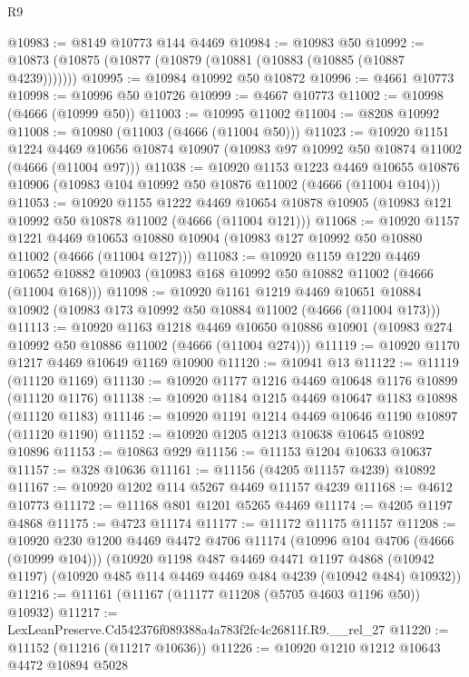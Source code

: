 \begin{lexlean}{R9}
\begin{coremodule}
@10983 := @8149 @10773 @144 @4469
@10984 := @10983 @50
@10992 := @10873 (@10875 (@10877 (@10879 (@10881 (@10883 (@10885 (@10887 @4239)))))))
@10995 := @10984 @10992 @50 @10872
@10996 := @4661 @10773
@10998 := @10996 @50 @10726
@10999 := @4667 @10773
@11002 := @10998 (@4666 (@10999 @50))
@11003 := @10995 @11002
@11004 := @8208 @10992
@11008 := @10980 (@11003 (@4666 (@11004 @50)))
@11023 := @10920
    @1151
    @1224
    @4469
    @10656
    @10874
    @10907
    (@10983 @97 @10992 @50 @10874 @11002 (@4666 (@11004 @97)))
@11038 := @10920
    @1153
    @1223
    @4469
    @10655
    @10876
    @10906
    (@10983 @104 @10992 @50 @10876 @11002 (@4666 (@11004 @104)))
@11053 := @10920
    @1155
    @1222
    @4469
    @10654
    @10878
    @10905
    (@10983 @121 @10992 @50 @10878 @11002 (@4666 (@11004 @121)))
@11068 := @10920
    @1157
    @1221
    @4469
    @10653
    @10880
    @10904
    (@10983 @127 @10992 @50 @10880 @11002 (@4666 (@11004 @127)))
@11083 := @10920
    @1159
    @1220
    @4469
    @10652
    @10882
    @10903
    (@10983 @168 @10992 @50 @10882 @11002 (@4666 (@11004 @168)))
@11098 := @10920
    @1161
    @1219
    @4469
    @10651
    @10884
    @10902
    (@10983 @173 @10992 @50 @10884 @11002 (@4666 (@11004 @173)))
@11113 := @10920
    @1163
    @1218
    @4469
    @10650
    @10886
    @10901
    (@10983 @274 @10992 @50 @10886 @11002 (@4666 (@11004 @274)))
@11119 := @10920 @1170 @1217 @4469 @10649 @1169 @10900
@11120 := @10941 @13
@11122 := @11119 (@11120 @1169)
@11130 := @10920 @1177 @1216 @4469 @10648 @1176 @10899 (@11120 @1176)
@11138 := @10920 @1184 @1215 @4469 @10647 @1183 @10898 (@11120 @1183)
@11146 := @10920 @1191 @1214 @4469 @10646 @1190 @10897 (@11120 @1190)
@11152 := @10920 @1205 @1213 @10638 @10645 @10892 @10896
@11153 := @10863 @929
@11156 := @11153 @1204 @10633 @10637
@11157 := @328 @10636
@11161 := @11156 (@4205 @11157 @4239) @10892
@11167 := @10920 @1202 @114 @5267 @4469 @11157 @4239
@11168 := @4612 @10773
@11172 := @11168 @801 @1201 @5265 @4469
@11174 := @4205 @1197 @4868
@11175 := @4723 @11174
@11177 := @11172 @11175 @11157
@11208 := @10920
    @230
    @1200
    @4469
    @4472
    @4706
    @11174
    (@10996 @104 @4706 (@4666 (@10999 @104)))
    (@10920
      @1198
      @487
      @4469
      @4471
      @1197
      @4868
      (@10942 @1197)
      (@10920 @485 @114 @4469 @4469 @484 @4239 (@10942 @484) @10932))
@11216 := @11161 (@11167 (@11177 @11208 (@5705 @4603 @1196 @50)) @10932)
@11217 := LexLeanPreserve.Cd542376f089388a4a783f2fc4c26811f.R9.__rel_27
@11220 := @11152 (@11216 (@11217 @10636))
@11226 := @10920 @1210 @1212 @10643 @4472 @10894 @5028

\end{coremodule}
\end{lexlean}

